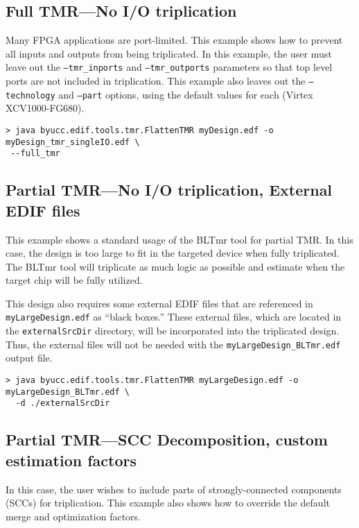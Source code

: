 \documentclass[english]{article}
\begin{document}
\subsection{Full TMR---No I/O triplication}
Many FPGA applications are port-limited. This example shows how to prevent all 
inputs and outputs from being triplicated. In this example, the user must leave 
out the \texttt{--tmr\_inports} and \texttt{--tmr\_outports} parameters so that 
top level ports are not included in triplication. This example also leaves out 
the \texttt{--technology} and \texttt{--part} options, using the default values 
for each (Virtex XCV1000-FG680).

\begin{verbatim}
> java byucc.edif.tools.tmr.FlattenTMR myDesign.edf -o myDesign_tmr_singleIO.edf \
 --full_tmr
\end{verbatim}


\subsection{Partial TMR---No I/O triplication, External EDIF files}
This example shows a standard usage of the BLTmr tool for partial TMR\@. In this 
case, the design is too large to fit in the targeted device when fully 
triplicated. The BLTmr tool will triplicate as much logic as possible and 
estimate when the target chip will be fully utilized.

This design also requires some external EDIF files that are referenced in 
\texttt{myLargeDesign.edf} as ``black boxes.'' These external files, which are 
located in the \texttt{externalSrcDir} directory, will be incorporated into the 
triplicated design. Thus, the external files will not be needed with the 
\texttt{myLargeDesign\_BLTmr.edf} output file.

\begin{verbatim}
> java byucc.edif.tools.tmr.FlattenTMR myLargeDesign.edf -o myLargeDesign_BLTmr.edf \
  -d ./externalSrcDir
\end{verbatim}


\subsection{Partial TMR---SCC Decomposition, custom estimation factors}
In this case, the user wishes to include parts of strongly-connected components 
(SCCs) for triplication. This example also shows how to override the default
merge and optimization factors.
\end{document}
